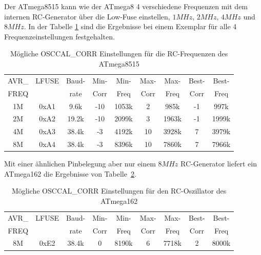 Der ATmega8515 kann wie der ATmega8 4 verschiedene Frequenzen
mit dem internen RC-Generator
über die Low-Fuse einstellen, \(1MHz\), \(2MHz\), \(4MHz\) und \(8MHz\).
In der Tabelle \ref{tab:mega8515freq} sind die Ergebnisse bei einem Exemplar für
 alle 4 Frequenzeinstellungen festgehalten.

\begin{table}[H]
  \begin{center}
    \begin{tabular}{| c | c | c || c | c || c | c || c | c |}
    \hline
             AVR\_ & LFUSE & Baud- & Min- & Min- & Max- & Max- & Best- & Best-  \\
             FREQ  &       & rate & Corr & Freq & Corr & Freq  & Corr  & Freq  \\
    \hline
    \hline
                1M & 0xA1  &  9.6k &  -10  & 1053k &  2  & 985k  & -1  & 997k \\
    \hline
                2M & 0xA2  & 19.2k &  -10  & 2099k &  3  & 1963k & -1  & 1999k \\
    \hline
                4M & 0xA3  & 38.4k &  -3  & 4192k &  10  & 3928k & 7  & 3979k \\
    \hline
                8M & 0xA4  & 38.4k &  -3  & 8396k &  10  & 7860k & 7  & 7966k \\
    \hline
    \end{tabular}
  \end{center}
  \caption{Mögliche OSCCAL\_CORR Einstellungen für die RC-Frequenzen des ATmega8515}
  \label{tab:mega8515freq}
\end{table}

Mit einer ähnlichen Pinbelegung aber nur einem \(8MHz\) RC-Generator liefert
ein ATmega162 die Ergebnisse von Tabelle~\ref{tab:mega162freq}.

\begin{table}[H]
  \begin{center}
    \begin{tabular}{| c | c | c || c | c || c | c || c | c |}
    \hline
             AVR\_ & LFUSE & Baud- & Min- & Min- & Max- & Max- & Best- & Best-  \\
             FREQ  &       & rate & Corr & Freq & Corr & Freq  & Corr  & Freq  \\
    \hline
    \hline
                8M & 0xE2  & 38.4k &  0  & 8190k &   6  & 7718k & 2  & 8000k \\
    \hline
    \end{tabular}
  \end{center}
  \caption{Mögliche OSCCAL\_CORR Einstellungen für den RC-Oszillator des ATmega162}
  \label{tab:mega162freq}
\end{table}


